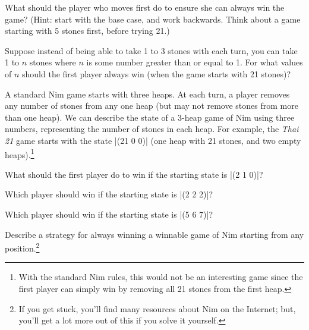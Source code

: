 \begin{schemeregion}
{{\begin{subexerciselist} 
\item \greenstar What should the player who moves first do to ensure she can always win the game?  (Hint: start with the base case, and work backwards.  Think about a game starting with 5 stones first, before trying 21.)
\item \bluestar Suppose instead of being able to take 1 to 3 stones with each turn, you can take 1 to $n$ stones where $n$ is some number greater than or equal to 1.  For what values of $n$ should the first player always win (when the game starts with 21 stones)?

A standard Nim game starts with three heaps.  At each turn, a player removes any number of stones from any one heap (but may not remove stones from more than one heap).  We can describe the state of a 3-heap game of Nim using three numbers, representing the number of stones in each heap.  For example, the \emph{Thai 21} game starts with the state \scheme|(21 0 0)| (one heap with 21 stones, and two empty heaps).\footnote{With the standard Nim rules, this would not be an interesting game since the first player can simply win by removing all 21 stones from the first heap.} 
\item What should the first player do to win if the starting state is \scheme|(2 1 0)|?
\item Which player should win if the starting state is \scheme|(2 2 2)|?
\item \goldstar Which player should win if the starting state is \scheme|(5 6 7)|?
\item \doublegoldstar Describe a strategy for always winning a winnable game of Nim starting from any position.\footnote{If you get stuck, you'll find many resources about Nim on the Internet; but, you'll get a lot more out of this if you solve it yourself.}


\end{subexerciselist}}}
\end{schemeregion}
